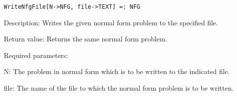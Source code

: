 \begin{itemize}
\protect \large \begin{verbatim}
WriteNfgFile[N->NFG, file->TEXT] =: NFG
\end{verbatim}\normalsize

\bd
\item
[Description:] Writes the given normal form problem to the specified 
file.  
\item
[Return value:] Returns the same normal form problem.
\item
[Required parameters:]\hfil\null

\bd
\item
[ N:] The problem in normal form which is to be written to the
indicated file.

\item
[file:] The name of the file to which the normal form problem is
to be written.
\ed
\ed
\end{itemize}





























